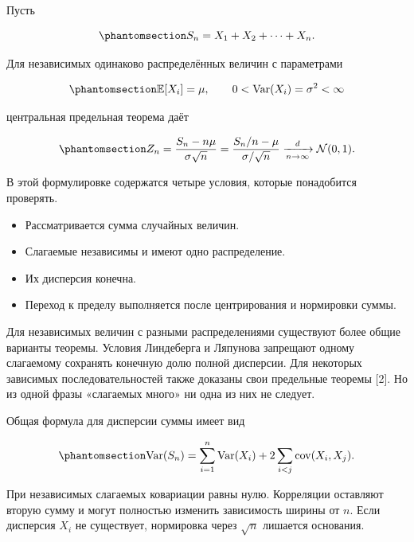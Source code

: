 \documentclass[
  russian,
  11pt,
  a4paper,
  open=any]{scrbook}
\providecommand{\tightlist}{%
  \setlength{\itemsep}{0pt}\setlength{\parskip}{0pt}}
\begin{document}
Пусть

\begin{equation}\protect\phantomsection\label{eq-ch5-random-sum}{
S_n=X_1+X_2+\cdots+X_n.
}\end{equation}

Для независимых одинаково распределённых величин с параметрами

\begin{equation}\protect\phantomsection\label{eq-ch5-iid-moments}{
\mathbb E[X_i]=\mu,
\qquad
0<\operatorname{Var}(X_i)=\sigma^2<\infty
}\end{equation}

центральная предельная теорема даёт

\begin{equation}\protect\phantomsection\label{eq-ch5-central-limit-theorem}{
Z_n=
\frac{S_n-n\mu}{\sigma\sqrt n}
=\frac{S_n/n-\mu}{\sigma/\sqrt n}
\xrightarrow[n\to\infty]{d}\mathcal N(0,1).
}\end{equation}

В этой формулировке содержатся четыре условия, которые понадобится
проверять.

\begin{itemize}
\tightlist
\item
  Рассматривается сумма случайных величин.
\item
  Слагаемые независимы и имеют одно распределение.
\item
  Их дисперсия конечна.
\item
  Переход к пределу выполняется после центрирования и нормировки суммы.
\end{itemize}

Для независимых величин с разными распределениями существуют более общие
варианты теоремы. Условия Линдеберга и Ляпунова запрещают одному
слагаемому сохранять конечную долю полной дисперсии. Для некоторых
зависимых последовательностей также доказаны свои предельные теоремы
{[}2{]}. Но из одной фразы «слагаемых много» ни одна из них не следует.

Общая формула для дисперсии суммы имеет вид

\begin{equation}\protect\phantomsection\label{eq-ch5-sum-variance}{
\operatorname{Var}(S_n)
=\sum_{i=1}^{n}\operatorname{Var}(X_i)
+2\sum_{i<j}\operatorname{cov}(X_i,X_j).
}\end{equation}

При независимых слагаемых ковариации равны нулю. Корреляции оставляют
вторую сумму и могут полностью изменить зависимость ширины от \(n\).
Если дисперсия \(X_i\) не существует, нормировка через \(\sqrt n\)
лишается основания.
\end{document}
